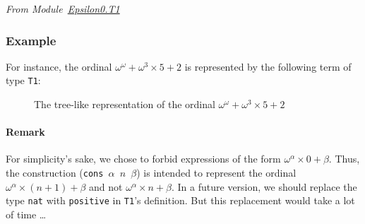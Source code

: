 \vspace{4pt}
\noindent\emph{From Module~\href{../theories/html/hydras.Epsilon0.T1.html\#T1}{Epsilon0.T1}}

\label{types:T1}



\subsubsection{Example}

\label{alpha0-def}
For instance, the ordinal  $\omega^\omega+\omega^3\times 5+2$ is represented by the following term of type \texttt{T1}:





\begin{figure}[htb]
\centering
{}

\caption{The tree-like representation of the ordinal $\omega^\omega+\omega^3\times 5 +2$\label{fig:cnf-tree}}

\end{figure}



\paragraph{Remark}
For simplicity's sake, we chose to forbid  expressions of the form $\omega^\alpha\times 0 + \beta$. Thus, the construction (\texttt{cons $\alpha$ $n$ $\beta$}) is intended to represent the
ordinal $\omega^\alpha\times(n+1)+\beta$ and not $\omega^\alpha\times n+\beta$.
In a future version, we should replace  the type \texttt{nat} with \texttt{positive} in \texttt{T1}'s 
definition. But this replacement would take a lot of time \dots{}


